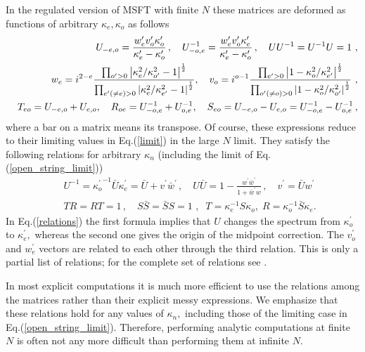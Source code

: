 \documentclass[a4paper,aps,preprint,nofootinbib,eqsecnum]{revtex4}
\begin{document}
In the regulated version of MSFT with finite $N$ these matrices are deformed
as functions of arbitrary $\kappa _{e},\kappa _{o}$ as follows
\begin{eqnarray}
&&U_{-e,o}=\frac{w_{e}^{\prime }v_{o}^{\prime }\kappa _{o}^{\prime }}{\kappa
_{e}^{\prime }-\kappa _{o}^{\prime }}\,,\quad U_{-o,e}^{-1}=\frac{%
w_{e}^{\prime }v_{o}^{\prime }\kappa _{e}^{\prime }}{\kappa _{e}^{\prime
}-\kappa _{o}^{\prime }}\,,\quad UU^{-1}=U^{-1}U=1\,\,,  \label{U_exp} \\
&&w_{e} ={i^{2-e}}\frac{\prod_{o^{\prime }>0}\left\vert \kappa
_{e}^{2}/\kappa _{o^{\prime }}^{2}-1\right\vert ^{\frac{1}{2}}}{%
\prod_{e^{\prime }(\neq e)>0}\left\vert \kappa _{e}^{2}/\kappa _{e^{\prime
}}^{2}-1\right\vert ^{\frac{1}{2}}},\quad v_{o}={i^{o-1}}\frac{%
\prod_{e^{\prime }>0}\left\vert 1-\kappa _{o}^{2}/\kappa _{e^{\prime
}}^{2}\right\vert ^{\frac{1}{2}}}{\prod_{o^{\prime }(\neq o)>0}\left\vert
1-\kappa _{o}^{2}/\kappa _{o^{\prime }}^{2}\right\vert ^{\frac{1}{2}}}
\,\,,
\label{wv_exp} \\
&&T_{eo}=U_{-e,o}+U_{e,o},\quad
R_{oe}=U_{-o,e}^{-1}+U_{o,e}^{-1},\quad
S_{eo}=U_{-e,o}-U_{e,o}=U_{-o,e}^{-1}-U_{o,e}^{-1}\,,
\end{eqnarray}%
where a bar on a matrix means its transpose. Of course, these expressions
reduce to their limiting values in Eq.(\ref{limit}) in the large $N$ limit.
They satisfy the following relations for arbitrary $\kappa _{n}$ (including
the limit of Eq.(\ref{open_string_limit}))
\begin{eqnarray}
&& U^{-1}={\kappa _{o}^{\prime }}^{-1}\bar{U}\kappa _{e}^{\prime }=\bar{U}%
+v^{\prime }\bar{w}^{\prime }\,,\quad U\bar{U}=1-\frac{w^{\prime }\bar{w}%
^{\prime }}{1+\bar{w}^{\prime }w}\,,\quad v^{\prime
}=\bar{U}w^{\prime }\,\,\label{relations} \\
&& TR=RT=1\,,\quad S\bar{S}=\bar{S}S=1\,\,,\;\;T=\kappa
_{e}^{-1}S\kappa _{o},\;R=\kappa _{o}^{-1}\bar{S}\kappa _{e}.
\end{eqnarray}%
In Eq.(\ref{relations}) the first formula implies that $U$ changes
the spectrum from $\kappa _{o}^{\prime }$ to $\kappa _{e}^{\prime
},$ whereas the second one gives the origin of the midpoint
correction. The $v_{o}^{\prime }$ and $w_{e}^{\prime } $ vectors
are related to each other through the third relation. This is only
a partial list of relations; for the complete set of relations see \cite{BM2}%
.

In most explicit computations it is much more efficient to use the relations
among the matrices rather than their explicit messy expressions. We
emphasize that these relations hold for any values of $\kappa _{n},$
including those of the limiting case in Eq.(\ref{open_string_limit}).
Therefore, performing analytic computations at finite $N$ is often not any
more difficult than performing them at infinite $N.$
\end{document}
